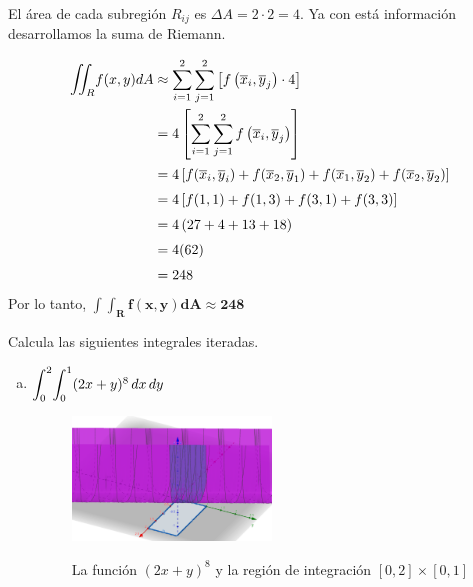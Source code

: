 \documentclass[12pt]{exam}
\begin{document}
\begin{questions}
El área de cada subregión $R_{ij}$ es $\Delta A = 2\cdot2 = 4$. Ya con está información desarrollamos la suma de Riemann.

\begin{align*}
    \mathlarger{\iint}_Rf(x,y)dA
    &\approx \sum_{i=1}^{2} \sum_{j=1}^{2} \left[f\left(\overline{x}_i, \overline{y}_j\right) \cdot 4\right]\\
    &= 4 \left[\sum_{i=1}^{2} \sum_{j=1}^{2}f\left(\overline{x}_i, \overline{y}_j\right) \right]\\
    &= 4 \left[f(\overline{x}_i,\overline{y}_i)+f(\overline{x}_2,\overline{y}_1)+f(\overline{x}_1,\overline{y}_2)+f(\overline{x}_2,\overline{y}_2) \right]\\
    &= 4 \left[f(1,1)+f(1,3)+f(3,1)+f(3,3) \right]\\
    &= 4 \left(27+4+13+18\right) \\
    &= 4( 62)\\
    &= 248
  \end{align*}
Por lo tanto,  $\boldsymbol{\int \int _R f(x,y) dA \approx 248}$


     \question
     Calcula las siguientes integrales iteradas.
     \begin{enumerate}[a)]
     \item $\mathlarger{\int}_0^2\mathlarger{\int}_0^{1}(2x+y)^8\,dx\,dy$
       \begin{figure}[h]
      \centering
      \includegraphics[width=0.5\textwidth]{./img/i1e3.png}
      \label{fig:región}
      \caption{La función $(2x+y)^8$ y la región de integración $[0,2]\times[0,1]$}
       \end{figure}


\end{enumerate}
\end{questions}
\end{document}
